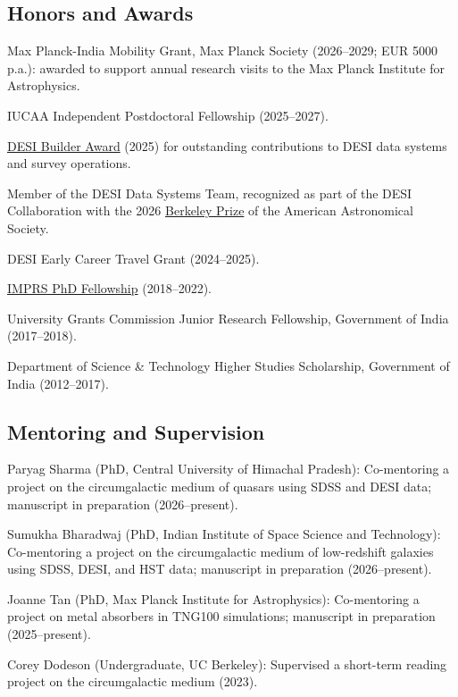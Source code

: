 \documentclass[12pt,letterpaper]{article}
\begin{document}
\subsection{Honors and Awards}
\begin{list}{}{\cvlist}
\item Max Planck-India Mobility Grant, Max Planck Society (2026--2029; EUR 5000 p.a.): awarded to support annual research visits to the Max Planck Institute for Astrophysics.
\item IUCAA Independent Postdoctoral Fellowship (2025--2027).
\item \href{https://www.desi.lbl.gov/collaboration/desi-builders/}{DESI Builder Award} (2025) for outstanding contributions to DESI data systems and survey operations.
\item Member of the DESI Data Systems Team, recognized as part of the DESI Collaboration with the 2026 \href{https://aas.org/press/desi-collaboration-receive-2026-berkeley-prize}{Berkeley Prize} of the American Astronomical Society.
\item DESI Early Career Travel Grant (2024--2025).
\item \href{https://www.imprs-astro.mpg.de/content/student-class-2018-2021.html}{IMPRS PhD Fellowship} (2018--2022).
\item University Grants Commission Junior Research Fellowship, Government of India (2017--2018).
\item Department of Science \& Technology Higher Studies Scholarship, Government of India (2012--2017).
\end{list}

\vspace{-1.5mm}

\subsection{Mentoring and Supervision}
\begin{list}{}{\cvlist}
\item Paryag Sharma (PhD, Central University of Himachal Pradesh): Co-mentoring a project on the circumgalactic medium of quasars using SDSS and DESI data; manuscript in preparation (2026--present).
\item Sumukha Bharadwaj (PhD, Indian Institute of Space Science and Technology): Co-mentoring a project on the circumgalactic medium of low-redshift galaxies using SDSS, DESI, and HST data; manuscript in preparation (2026--present).
\item Joanne Tan (PhD, Max Planck Institute for Astrophysics): Co-mentoring a project on metal absorbers in TNG100 simulations; manuscript in preparation (2025--present).
\item Corey Dodeson (Undergraduate, UC Berkeley): Supervised a short-term reading project on the circumgalactic medium (2023).
\end{list}
\end{document}
